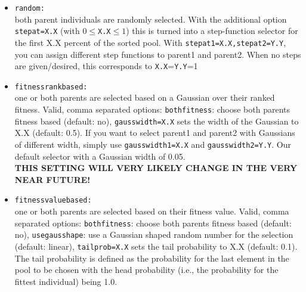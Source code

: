 \documentclass[a4paper,10pt]{scrbook}
\begin{document}
\begin{itemize}
\begin{itemize}
	 \item \texttt{random:} \\ both parent individuals are randomly
           selected. With the additional option \texttt{stepat=X.X} (with
           $0\leq $\texttt{X.X}$ \leq 1$) this is turned into a step-function
           selector for the first X.X percent of the sorted pool. With
           \texttt{stepat1=X.X,stepat2=Y.Y}, you can assign
           different step functions to parent1 and parent2. When no steps
           are given/desired, this corresponds to \texttt{X.X}=\texttt{Y.Y}=1
	 \item \texttt{fitnessrankbased:} \\  one or both parents are selected
	 based on a Gaussian over their ranked fitness. Valid, comma separated
	 options:
	 \texttt{bothfitness}: choose both parents fitness based (default: no),
	 \texttt{gausswidth=X.X} sets the width of the Gaussian to X.X (default:
	 0.5). 
         If you want to select parent1 and parent2 with Gaussians of different
         width, simply use \texttt{gausswidth1=X.X} and
         \texttt{gausswidth2=Y.Y}. 
         Our default selector with a Gaussian width of 0.05.\\
	 \textbf{THIS SETTING WILL VERY LIKELY CHANGE IN THE VERY NEAR FUTURE!}
	 \item \texttt{fitnessvaluebased:} \\  one or both parents are selected
	 based on their fitness value. Valid, comma separated options:
	 \texttt{bothfitness}: choose both parents fitness based (default: no),
	 \texttt{usegausshape}: use a Gaussian shaped random number for the
	 selection (default: linear), \texttt{tailprob=X.X} sets the tail 
probability
	 to X.X (default: 0.1). The tail probability is defined as the 
probability
	 for the last element in the pool to be chosen with the head probability
	 (i.e., the probability for the fittest individual) being 1.0.
	\end{itemize}


\end{itemize}
\end{document}
